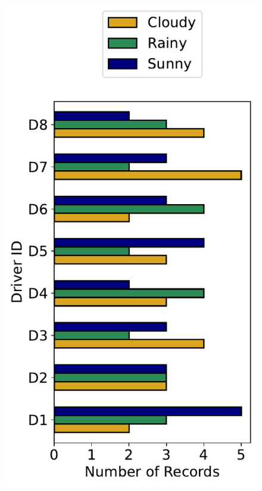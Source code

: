 \begin{figure}[h]
\begin{minipage}{0.33\textwidth}
    \end{minipage}\hfill
    \begin{minipage}{0.33\textwidth}
        \centering
        \includegraphics[width=\textwidth]{images/dreyeve/weather_distrib.pdf}
    \end{minipage}\hfill
    \begin{minipage}{0.33\textwidth}

\end{minipage}
\end{figure}
